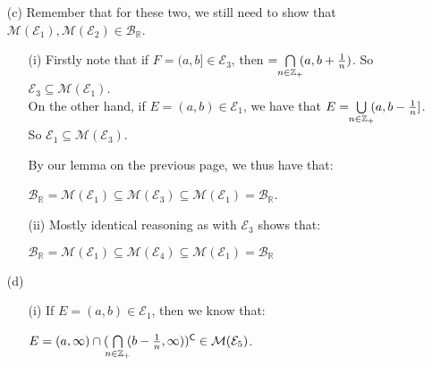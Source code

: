 \documentclass{book}
\newenvironment{myIndent}{%
   \begin{adjustwidth}{2.5em}{0em}%
}{%
   \end{adjustwidth}%
}
\newcommand{\comp}{\mathsf{C}}
\newcommand{\retTwo}{\hfill\bigbreak}
\begin{document}
\begin{myIndent}
\begin{itemize}
      \item[(c)] Remember that for these two, we still need to show that $\mathcal{M}(\mathcal{E}_1), \mathcal{M}(\mathcal{E}_2) \in \mathcal{B}_\mathbb{R}$.
      \begin{itemize}
         \item[(i)] Firstly note that if $F = (a, b] \in \mathcal{E}_3$, then $ = \hspace{-0.3em}\bigcap\limits_{n \in \mathbb{Z}_+}\hspace{-0.3em} (a, b+\frac{1}{n})$. So $\mathcal{E}_3 \subseteq \mathcal{M}(\mathcal{E}_1)$.\\
         On the other hand, if $E = (a, b) \in \mathcal{E}_1$, we have that $E = \hspace{-0.3em}\bigcup\limits_{n \in \mathbb{Z}_+}\hspace{-0.3em} (a, b-\frac{1}{n}]$.\\ [-9pt] So $\mathcal{E}_1 \subseteq \mathcal{M}(\mathcal{E}_3)$.\retTwo
         
         By our lemma on the previous page, we thus have that:
         
         {\centering $\mathcal{B}_\mathbb{R} = \mathcal{M}(\mathcal{E}_1) \subseteq \mathcal{M}(\mathcal{E}_3) \subseteq \mathcal{M}(\mathcal{E}_1) = \mathcal{B}_\mathbb{R}$. \retTwo\par}

         \item[(ii)] Mostly identical reasoning as with $\mathcal{E}_3$ shows that:
         
         {\centering $\mathcal{B}_\mathbb{R} = \mathcal{M}(\mathcal{E}_1) \subseteq \mathcal{M}(\mathcal{E}_4) \subseteq \mathcal{M}(\mathcal{E}_1) = \mathcal{B}_\mathbb{R}$\retTwo\par}
      \end{itemize}

      \item[(d)] \phantom{a}\\ [-10pt]
      \begin{itemize}
         \item[(i)] If $E = (a, b) \in \mathcal{E}_1$, then we know that:
         
         {\centering$E  = (a, \infty) \cap (\hspace{-0.3em}\bigcap\limits_{n \in \mathbb{Z}_+}\hspace{-0.3em} (b - \frac{1}{n}, \infty))^\comp \in \mathcal{M}(\mathcal{E}_5)$.\\\par}


\end{itemize}
\end{itemize}
\end{myIndent}
\end{document}
